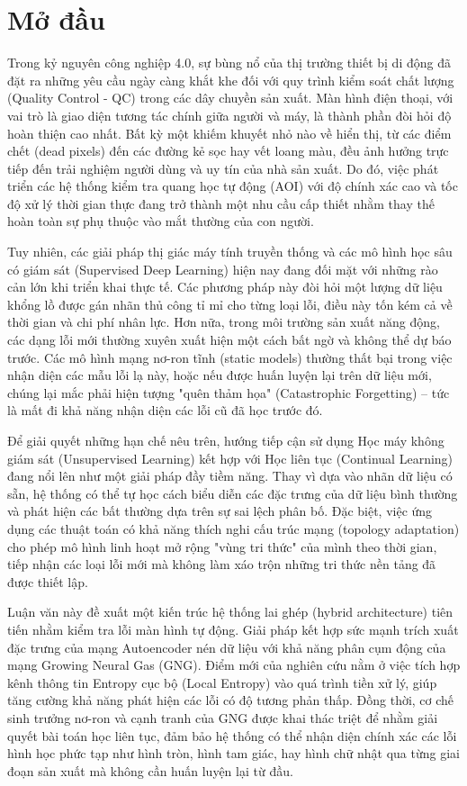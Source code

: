 \chapter*{Mở đầu}
\setcounter{page}{1}
Trong kỷ nguyên công nghiệp 4.0, sự bùng nổ của thị trường thiết bị di động đã đặt ra những yêu cầu ngày càng khắt khe đối với quy trình kiểm soát chất lượng (Quality Control - QC) trong các dây chuyền sản xuất. Màn hình điện thoại, với vai trò là giao diện tương tác chính giữa người và máy, là thành phần đòi hỏi độ hoàn thiện cao nhất. Bất kỳ một khiếm khuyết nhỏ nào về hiển thị, từ các điểm chết (dead pixels) đến các đường kẻ sọc hay vết loang màu, đều ảnh hưởng trực tiếp đến trải nghiệm người dùng và uy tín của nhà sản xuất. Do đó, việc phát triển các hệ thống kiểm tra quang học tự động (AOI) với độ chính xác cao và tốc độ xử lý thời gian thực đang trở thành một nhu cầu cấp thiết nhằm thay thế hoàn toàn sự phụ thuộc vào mắt thường của con người.

Tuy nhiên, các giải pháp thị giác máy tính truyền thống và các mô hình học sâu có giám sát (Supervised Deep Learning) hiện nay đang đối mặt với những rào cản lớn khi triển khai thực tế. Các phương pháp này đòi hỏi một lượng dữ liệu khổng lồ được gán nhãn thủ công tỉ mỉ cho từng loại lỗi, điều này tốn kém cả về thời gian và chi phí nhân lực. Hơn nữa, trong môi trường sản xuất năng động, các dạng lỗi mới thường xuyên xuất hiện một cách bất ngờ và không thể dự báo trước. Các mô hình mạng nơ-ron tĩnh (static models) thường thất bại trong việc nhận diện các mẫu lỗi lạ này, hoặc nếu được huấn luyện lại trên dữ liệu mới, chúng lại mắc phải hiện tượng "quên thảm họa" (Catastrophic Forgetting) – tức là mất đi khả năng nhận diện các lỗi cũ đã học trước đó.

Để giải quyết những hạn chế nêu trên, hướng tiếp cận sử dụng Học máy không giám sát (Unsupervised Learning) kết hợp với Học liên tục (Continual Learning) đang nổi lên như một giải pháp đầy tiềm năng. Thay vì dựa vào nhãn dữ liệu có sẵn, hệ thống có thể tự học cách biểu diễn các đặc trưng của dữ liệu bình thường và phát hiện các bất thường dựa trên sự sai lệch phân bố. Đặc biệt, việc ứng dụng các thuật toán có khả năng thích nghi cấu trúc mạng (topology adaptation) cho phép mô hình linh hoạt mở rộng "vùng tri thức" của mình theo thời gian, tiếp nhận các loại lỗi mới mà không làm xáo trộn những tri thức nền tảng đã được thiết lập.

Luận văn này đề xuất một kiến trúc hệ thống lai ghép (hybrid architecture) tiên tiến nhằm kiểm tra lỗi màn hình tự động. Giải pháp kết hợp sức mạnh trích xuất đặc trưng của mạng Autoencoder nén dữ liệu với khả năng phân cụm động của mạng Growing Neural Gas (GNG). Điểm mới của nghiên cứu nằm ở việc tích hợp kênh thông tin Entropy cục bộ (Local Entropy) vào quá trình tiền xử lý, giúp tăng cường khả năng phát hiện các lỗi có độ tương phản thấp. Đồng thời, cơ chế sinh trưởng nơ-ron và cạnh tranh của GNG được khai thác triệt để nhằm giải quyết bài toán học liên tục, đảm bảo hệ thống có thể nhận diện chính xác các lỗi hình học phức tạp như hình tròn, hình tam giác, hay hình chữ nhật qua từng giai đoạn sản xuất mà không cần huấn luyện lại từ đầu.

